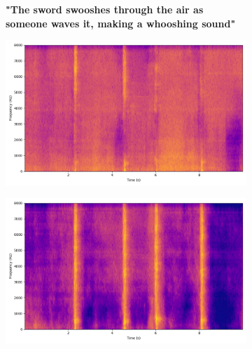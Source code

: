 \begin{figure}[!htbp]
    \begin{subfigure}[b]{0.3\textwidth}
        \centering
        \scriptsize\textbf{"The sword swooshes through the air as someone waves it, making a whooshing sound"}
        \vspace{10mm}
    \end{subfigure}
    \begin{subfigure}[b]{0.3\textwidth}
        \centering
        \includegraphics[width=\textwidth]{plots/sword_swoosh/onepeace sep_spectrogram.png}
    \end{subfigure}
    \begin{subfigure}[b]{0.3\textwidth}
        \centering
        \includegraphics[width=\textwidth]{plots/sword_swoosh/clap sep_spectrogram.png}
    \end{subfigure}


\end{figure}
